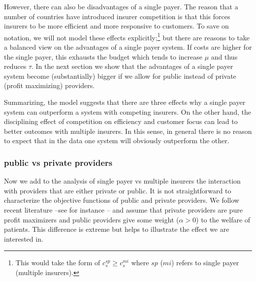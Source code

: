 \documentclass[12pt,english,a4paper]{article}
\begin{document}
However, there can also be disadvantages of a single payer. The reason that a number of countries have introduced insurer competition is that this forces insurers to be more efficient and more responsive to customers. To save on notation, we will not model these effects explicitly;\footnote{This would take the form of \(c_s^{sp} \geq c_s^{mi}\) where \(sp\) (\(mi\)) refers to single payer (multiple insurers).} but there are reasons to take a balanced view on the advantages of a single payer system. If costs are higher for the single payer, this exhausts the budget which tends to increase \(\mu\) and thus reduces \(\tau\). In the next section we show that the advantages of a single payer system become (substantially) bigger if we allow for public instead of private (profit maximizing) providers.

Summarizing, the model suggests that there are three effects why a single payer system can outperform a system with competing insurers. On the other hand, the disciplining effect of competition on efficiency and customer focus can lead to better outcomes with multiple insurers. In this sense, in general there is no reason to expect that in the data one system will obviously outperform the other.

\subsubsection{public vs private providers}
\label{sec:org23a9768}

Now we add to the analysis of single payer vs multiple insurers the interaction with providers that are either private or public. It is not straightforward to characterize the objective functions of public and private providers. We follow recent literature --see for instance \cite{Brekke2018}-- and assume that private providers are pure profit maximizers and public providers give some weight (\(\alpha > 0\)) to the welfare of patients. This difference is extreme but helps to illustrate the effect we are interested in.
\end{document}
